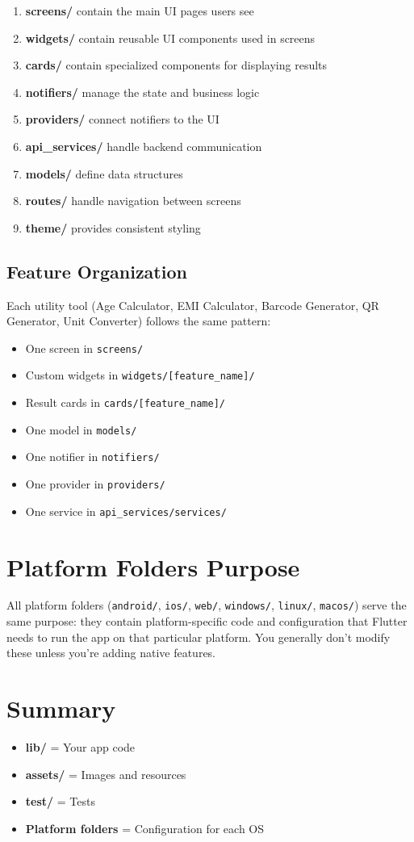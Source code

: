 \documentclass[12pt,a4paper]{article}
\begin{document}
\begin{enumerate}
    \item \textbf{screens/} contain the main UI pages users see
    \item \textbf{widgets/} contain reusable UI components used in screens
    \item \textbf{cards/} contain specialized components for displaying results
    \item \textbf{notifiers/} manage the state and business logic
    \item \textbf{providers/} connect notifiers to the UI
    \item \textbf{api\_services/} handle backend communication
    \item \textbf{models/} define data structures
    \item \textbf{routes/} handle navigation between screens
    \item \textbf{theme/} provides consistent styling
\end{enumerate}

\subsection{Feature Organization}

Each utility tool (Age Calculator, EMI Calculator, Barcode Generator, QR Generator, Unit Converter) follows the same pattern:

\begin{itemize}
    \item One screen in \texttt{screens/}
    \item Custom widgets in \texttt{widgets/[feature\_name]/}
    \item Result cards in \texttt{cards/[feature\_name]/}
    \item One model in \texttt{models/}
    \item One notifier in \texttt{notifiers/}
    \item One provider in \texttt{providers/}
    \item One service in \texttt{api\_services/services/}
\end{itemize}

\section{Platform Folders Purpose}

All platform folders (\texttt{android/}, \texttt{ios/}, \texttt{web/}, \texttt{windows/}, \texttt{linux/}, \texttt{macos/}) serve the same purpose: they contain platform-specific code and configuration that Flutter needs to run the app on that particular platform. You generally don't modify these unless you're adding native features.

\section{Summary}

\begin{itemize}
    \item \textbf{lib/} = Your app code
    \item \textbf{assets/} = Images and resources
    \item \textbf{test/} = Tests
    \item \textbf{Platform folders} = Configuration for each OS
\end{itemize}
\end{document}

